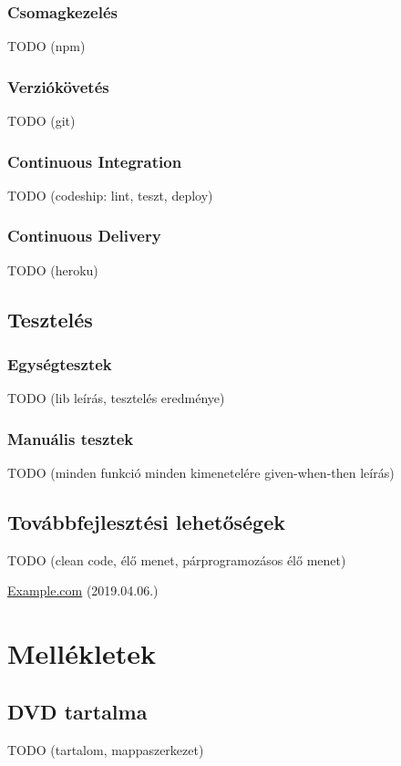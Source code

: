 \documentclass{elteikthesis}
\begin{document}
	\subsection{Csomagkezelés}
	TODO (npm)
	
	\subsection{Verziókövetés}
	TODO (git)
	
	\subsection{Continuous Integration}
	TODO (codeship: lint, teszt, deploy)
	
	\subsection{Continuous Delivery}
	TODO (heroku)
	
	\section{Tesztelés}
	\subsection{Egységtesztek}
	TODO (lib leírás, tesztelés eredménye)
	
	\subsection{Manuális tesztek}
	TODO (minden funkció minden kimenetelére given-when-then leírás)
	
	\section{Továbbfejlesztési lehetőségek}
	TODO (clean code, élő menet, párprogramozásos élő menet)

	\begin{thebibliography}{99}

		\href{http://example.com}{Example.com} (2019.04.06.)
	\end{thebibliography}
	
	\chapter*{Mellékletek}
	\section*{DVD tartalma}
	TODO (tartalom, mappaszerkezet)
\end{document}
